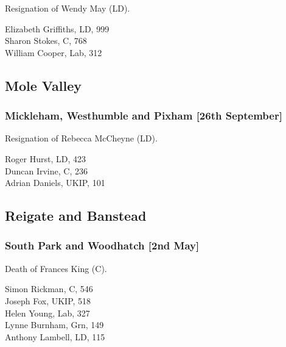 \documentclass[a4paper,openany,10pt]{book}
\begin{document}

Resignation of Wendy May (LD).



Elizabeth Griffiths, LD, 999\\
Sharon Stokes, C, 768\\
William Cooper, Lab, 312\\


\subsection*{Mole Valley}

\subsubsection*{Mickleham, Westhumble and Pixham \hspace*{\fill}\nolinebreak[1]%
\enspace\hspace*{\fill}
[26th September]}


Resignation of Rebecca McCheyne (LD).



Roger Hurst, LD, 423\\
Duncan Irvine, C, 236\\
Adrian Daniels, UKIP, 101\\


\subsection*{Reigate and Banstead}

\subsubsection*{South Park and Woodhatch \hspace*{\fill}\nolinebreak[1]%
\enspace\hspace*{\fill}
[2nd May]}


Death of Frances King (C).



Simon Rickman, C, 546\\
Joseph Fox, UKIP, 518\\
Helen Young, Lab, 327\\
Lynne Burnham, Grn, 149\\
Anthony Lambell, LD, 115\\
\end{document}
